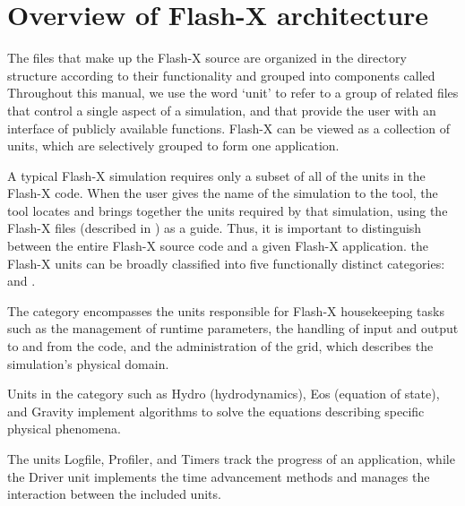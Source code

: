 \chapter{Overview of Flash-X architecture}
\label{Chp:Architecture}


The files that make up the Flash-X source are organized in the directory structure
according to their functionality and grouped into components called
Throughout this manual, we use the word `unit'
to refer to a group of related files that control a single aspect of a
simulation, and that provide the user with an interface of publicly 
available functions. Flash-X can be viewed as a collection of units, which
are selectively grouped to form one application.

A typical Flash-X simulation requires only a subset of all of the units in 
the Flash-X code. When the user gives the name of the simulation to the
 tool, the tool locates and brings together the units required
by that simulation, using the Flash-X  files (described in
) as a
guide. Thus, it is important to distinguish between the entire Flash-X 
source code and a given Flash-X application. 
the
Flash-X units can be broadly classified into five functionally distinct categories:
and .

The  category encompasses the units responsible for Flash-X housekeeping
tasks such as the management of runtime parameters, the handling of input and output
to and from the code, and the administration of the grid, which describes the simulation's
physical domain.

Units in the  category such as \unit{Hydro} (hydrodynamics), \unit{Eos} (equation of state),
and \unit{Gravity} implement algorithms to solve the equations describing specific physical
phenomena. 

The  units \unit{Logfile}, \unit{Profiler}, and \unit{Timers} track the progress of an
application, while the \unit{Driver} unit implements the time advancement methods and manages
the interaction between the included units.

